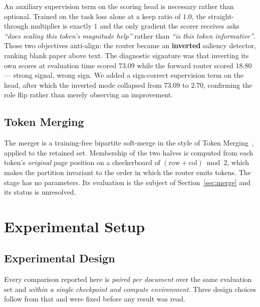 \documentclass[conference]{IEEEtran}
\begin{document}
An auxiliary supervision term on the scoring head is necessary rather than optional. Trained
on the task loss alone at a keep ratio of $1.0$, the straight-through multiplier is exactly
$1$ and the only gradient the scorer receives asks \emph{``does scaling this token's
magnitude help''} rather than \emph{``is this token informative''}. Those two objectives
anti-align: the router became an \textbf{inverted} saliency detector, ranking blank paper
above text. The diagnostic signature was that inverting its own scores at evaluation time
scored $73.09$ while the forward router scored $18.80$ --- strong signal, wrong sign. We
added a sign-correct supervision term on the head, after which the inverted mode collapsed
from $73.09$ to $2.70$, confirming the role flip rather than merely observing an improvement.

\subsection{Token Merging}

The merger is a training-free bipartite soft-merge in the style of Token
Merging~\cite{tome}, applied to the retained set. Membership of the two halves is computed
from each token's \emph{original} page position on a checkerboard of
$(\text{row} + \text{col}) \bmod 2$, which makes the partition invariant to the order in
which the router emits tokens. The stage has no parameters. Its evaluation is the subject of
Section~\ref{sec:merge} and its status is unresolved.

\section{Experimental Setup}

\subsection{Experimental Design}

Every comparison reported here is \emph{paired per document} over the same evaluation set and
\emph{within a single checkpoint and compute environment}. Three design choices follow from
that and were fixed before any result was read.
\end{document}
